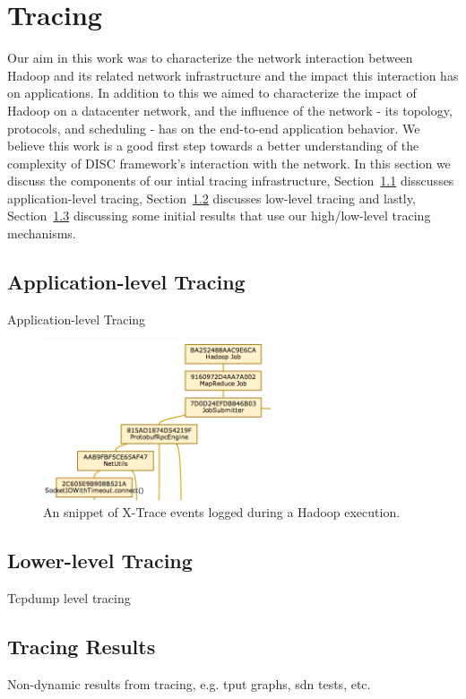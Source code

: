 \section{Tracing}
\label{sec:tracing}
Our aim in this work was to characterize the network interaction 
between Hadoop and its related network infrastructure and the impact this 
interaction has on applications. In addition to this we aimed to 
characterize the impact of Hadoop on a datacenter network, and the 
influence of the network - its topology, protocols, and scheduling - has on the 
end-to-end application behavior. We believe this work is a good first step 
towards a better understanding of the complexity of DISC framework's interaction
with the network. In this section we discuss the components of our intial tracing
infrastructure, Section~\ref{ssec:app} disscusses application-level tracing, 
Section~\ref{ssec:low} discusses low-level tracing and lastly, 
Section~\ref{ssec:results} discussing some initial results that use our high/low-level
tracing mechanisms.

\subsection{Application-level Tracing}
\label{ssec:app}
Application-level Tracing

\begin{figure}
\centering
\includegraphics[width=0.6\textwidth]{figures/xtrace.png}
\caption{An snippet of X-Trace events logged during a Hadoop execution.}
\label{fig:xtrace}
\end{figure}

\subsection{Lower-level Tracing}
\label{ssec:low}
Tcpdump level tracing

\subsection{Tracing Results}
\label{ssec:results}
Non-dynamic results from tracing, e.g. tput graphs, sdn tests, etc.


